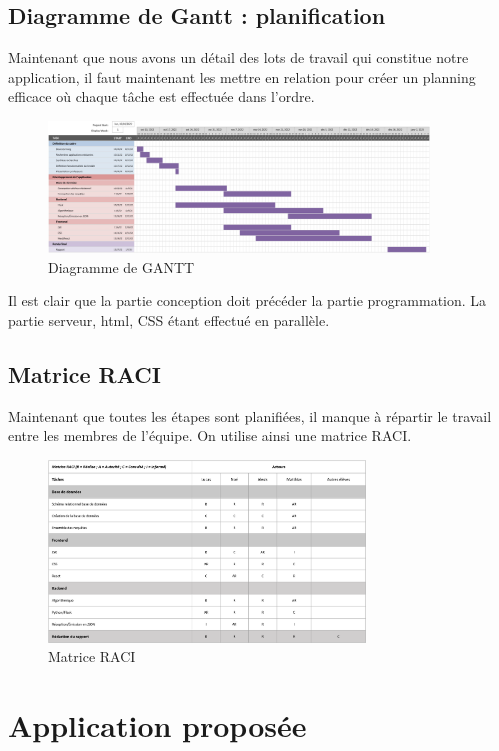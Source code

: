 \documentclass[french,a4paper]{article}
\begin{document}
\subsection{Diagramme de Gantt : planification}
Maintenant que nous avons un détail des lots de travail qui constitue notre application, il faut maintenant les mettre en relation pour créer un planning efficace où chaque tâche est effectuée dans l’ordre.
\begin{figure}[H]
    \centering
    \includegraphics[width=0.9\textwidth]{img/gantt.png}
    \caption{Diagramme de GANTT}
\end{figure} 
Il est clair que la partie conception doit précéder la partie programmation. La partie serveur, html, CSS étant effectué en parallèle.

\subsection{Matrice RACI}
Maintenant que toutes les étapes sont planifiées, il manque à répartir le travail entre les membres de l’équipe. On utilise ainsi une matrice RACI.
\begin{figure}[H]
    \centering
    \includegraphics[width=0.75\textwidth]{img/RACI.png}
    \caption{Matrice RACI}
\end{figure} 

\newpage
\section{Application proposée}
\end{document}
